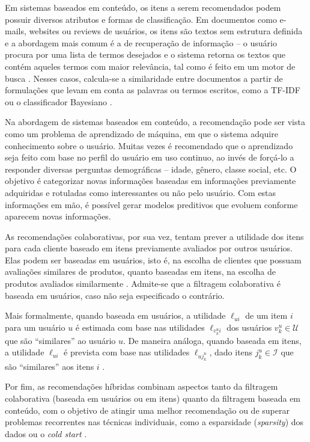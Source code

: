 Em sistemas baseados em conteúdo, os itens a serem recomendados podem possuir diversos atributos e formas de classificação. Em documentos como e-mails, websites ou reviews de usuários, os itens são textos sem estrutura definida e a abordagem mais comum é a de recuperação de informação -- o usuário procura por uma lista de termos desejados e o sistema retorna os textos que contém aqueles termos com maior relevância, tal como é feito em um motor de busca \cite{schafer2001commerce}. Nesses casos, calcula-se a similaridade entre documentos a partir de formulações que levam em conta as palavras ou termos escritos, como a TF-IDF ou o classificador Bayesiano \cite{lops2011content-chap3}. 

Na abordagem de sistemas baseados em conteúdo, a recomendação pode ser vista como um problema de aprendizado de máquina, em que o sistema adquire conhecimento sobre o usuário. Muitas vezes é recomendado que o aprendizado seja feito com base no perfil do usuário em uso continuo, ao invés de forçá-lo a responder diversas perguntas demográficas \cite{wei2007survey} -- idade, gênero, classe social, etc. O objetivo é categorizar novas informações baseadas em informações previamente adquiridas e rotuladas como interessantes ou não pelo usuário. Com estas informações em mão, é possível gerar modelos preditivos que evoluem conforme aparecem novas informações.

As recomendações colaborativas, por sua vez, tentam prever a utilidade dos itens para cada cliente baseado em itens previamente avaliados por outros usuários. Elas podem ser baseadas em usuários, isto é, na escolha de clientes  que possuam avaliações similares de produtos, quanto baseadas em itens, na escolha de produtos avaliados similarmente \cite{linden2003amazon}. Admite-se que a filtragem colaborativa é baseada em usuários, caso não seja especificado o contrário.  

Mais formalmente, quando baseada em usuários, a utilidade $\ell_{ui}$ de um item $i$ para um usuário $u$ é estimada com base nas utilidades $\ell_{v_k^u i}$ dos usuários $v_k^u \in \mathcal{U}$ que são ``similares'' ao usuário $u$.  De maneira análoga, quando baseada em itens, a utilidade $\ell_{ui}$ é prevista com base nas utilidades $\ell_{u j_k^u}$, dado itens $j_k^u \in \mathcal{I}$ que são ``similares'' aos itens $i$ .

Por fim, as recomendações híbridas combinam aspectos tanto da filtragem colaborativa (baseada em usuários ou em itens) quanto da filtragem baseada em conteúdo, com o objetivo de atingir uma melhor recomendação ou de superar problemas recorrentes nas técnicas individuais, como a esparsidade (\textit{sparsity}) dos dados ou o \textit{cold start} \cite{burke2007hybrid}.

